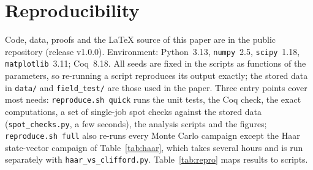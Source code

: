 \section{Reproducibility}\label{app:repro}

Code, data, proofs and the \LaTeX{} source of this paper are in the public repository \repo{} (release v1.0.0). Environment: Python~3.13, \texttt{numpy}~2.5, \texttt{scipy}~1.18, \texttt{matplotlib}~3.11; Coq~8.18. All seeds are fixed in the scripts as functions of the parameters, so re-running a script reproduces its output exactly; the stored data in \texttt{data/} and \texttt{field\_test/} are those used in the paper. Three entry points cover most needs: \texttt{reproduce.sh quick} runs the unit tests, the Coq check, the exact computations, a set of single-job spot checks against the stored data (\texttt{spot\_checks.py}, a few seconds), the analysis scripts and the figures; \texttt{reproduce.sh full} also re-runs every Monte Carlo campaign except the Haar state-vector campaign of Table~\ref{tab:haar}, which takes several hours and is run separately with \texttt{haar\_vs\_clifford.py}. Table~\ref{tab:repro} maps results to scripts.

